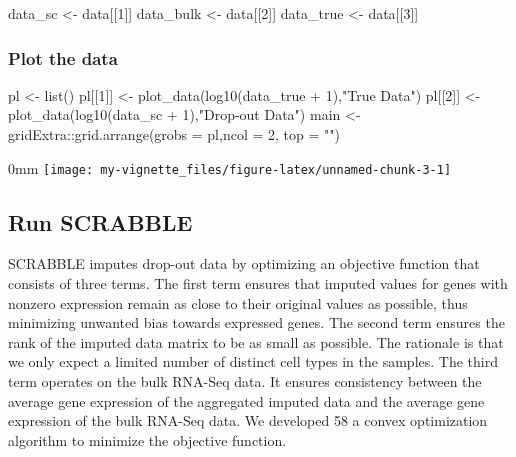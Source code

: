 \documentclass[]{article}
\newcommand{\hlnum}[1]{\textcolor[rgb]{0.816,0.125,0.439}{#1}}%
\newcommand{\hlstr}[1]{\textcolor[rgb]{0.251,0.627,0.251}{#1}}%
\newcommand{\hlopt}[1]{\textcolor[rgb]{0,0,0}{#1}}%
\newcommand{\hlstd}[1]{\textcolor[rgb]{0.251,0.251,0.251}{#1}}%
\newcommand{\hlkwc}[1]{\textcolor[rgb]{0.251,0.251,0.251}{#1}}%
\newcommand{\hlkwd}[1]{\textcolor[rgb]{0.878,0.439,0.125}{#1}}%
\newenvironment{Shaded}{\begin{myshaded}}{\end{myshaded}}
\newcommand{\KeywordTok}[1]{\hlkwd{#1}}
\newcommand{\DataTypeTok}[1]{\hlkwc{#1}}
\newcommand{\DecValTok}[1]{\hlnum{#1}}
\newcommand{\StringTok}[1]{\hlstr{#1}}
\newcommand{\OperatorTok}[1]{\hlopt{#1}}
\newcommand{\NormalTok}[1]{\hlstd{#1}}
\begin{document}
\begin{Shaded}
\begin{Highlighting}[]
\NormalTok{data_sc <-}\StringTok{ }\NormalTok{data[[}\DecValTok{1}\NormalTok{]]}
\NormalTok{data_bulk <-}\StringTok{ }\NormalTok{data[[}\DecValTok{2}\NormalTok{]]}
\NormalTok{data_true <-}\StringTok{ }\NormalTok{data[[}\DecValTok{3}\NormalTok{]]}
\end{Highlighting}
\end{Shaded}

\subsubsection{Plot the data}\label{plot-the-data}

\begin{Shaded}
\begin{Highlighting}[]
\NormalTok{pl <-}\StringTok{ }\KeywordTok{list}\NormalTok{()}
\NormalTok{pl[[}\DecValTok{1}\NormalTok{]] <-}\StringTok{ }\KeywordTok{plot_data}\NormalTok{(}\KeywordTok{log10}\NormalTok{(data_true }\OperatorTok{+}\StringTok{ }\DecValTok{1}\NormalTok{),}\StringTok{"True Data"}\NormalTok{)}
\NormalTok{pl[[}\DecValTok{2}\NormalTok{]] <-}\StringTok{ }\KeywordTok{plot_data}\NormalTok{(}\KeywordTok{log10}\NormalTok{(data_sc }\OperatorTok{+}\StringTok{ }\DecValTok{1}\NormalTok{),}\StringTok{"Drop-out Data"}\NormalTok{)}
\NormalTok{main <-}\StringTok{ }\NormalTok{gridExtra}\OperatorTok{::}\KeywordTok{grid.arrange}\NormalTok{(}\DataTypeTok{grobs =}\NormalTok{ pl,}\DataTypeTok{ncol =} \DecValTok{2}\NormalTok{, }\DataTypeTok{top =} \StringTok{""}\NormalTok{)}
\end{Highlighting}
\end{Shaded}

\begin{adjustwidth}{\fltoffset}{0mm}
\texttt{[image: my-vignette\_files/figure-latex/unnamed-chunk-3-1]} \end{adjustwidth}

\subsection{Run SCRABBLE}\label{run-scrabble}

SCRABBLE imputes drop-out data by optimizing an objective function that
consists of three terms. The first term ensures that imputed values for
genes with nonzero expression remain as close to their original values
as possible, thus minimizing unwanted bias towards expressed genes. The
second term ensures the rank of the imputed data matrix to be as small
as possible. The rationale is that we only expect a limited number of
distinct cell types in the samples. The third term operates on the bulk
RNA-Seq data. It ensures consistency between the average gene expression
of the aggregated imputed data and the average gene expression of the
bulk RNA-Seq data. We developed 58 a convex optimization algorithm to
minimize the objective function.
\end{document}
